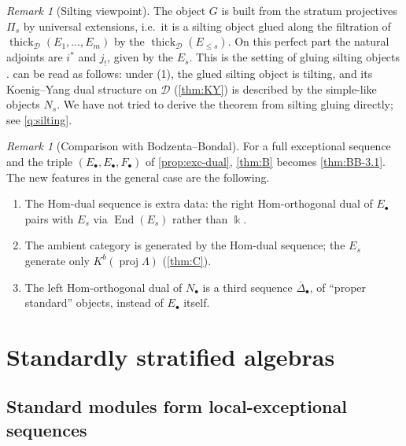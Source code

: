 \documentclass[11pt,reqno]{amsart}
\theoremstyle{plain}
\theoremstyle{definition}
\theoremstyle{remark}
\newtheorem{remark}[theorem]{Remark}
\newcommand{\kk}{\Bbbk}
\DeclareMathOperator{\End}{End}
\newcommand{\proj}{\operatorname{proj}}
\newcommand{\Kb}{K^b}
\newcommand{\thick}[2][\cD]{\operatorname{thick}_{#1}(#2)}
\newcommand{\Deltabar}{\overline{\Delta}}
\newcommand{\cD}{\mathcal{D}}
\begin{document}
\begin{remark}[Silting viewpoint]\label{rem:silting-view}
The object $G$ is built from the stratum projectives $\Pi_s$ by universal extensions, i.e.\ it is a silting object glued along the filtration of $\thick{E_1,\dots,E_m}$ by the $\thick{E_{\le s}}$. On this perfect part the natural adjoints are $i^*$ and $j_!$, given by the $E_s$. This is the setting of gluing silting objects \cite{LVY14}.  can be read as follows: under (1), the glued silting object is tilting, and its Koenig--Yang dual structure on $\cD$ (\cref{thm:KY}) is described by the simple-like objects $N_s$. We have not tried to derive the theorem from silting gluing directly; see \cref{q:silting}.
\end{remark}

\begin{remark}[Comparison with Bodzenta--Bondal]\label{rem:B-vs-BB}
For a full exceptional sequence and the triple $(E_\bullet,E_\bullet,F_\bullet)$ of \cref{prop:exc-dual}, \cref{thm:B} becomes \cref{thm:BB-3.1}. The new features in the general case are the following.
\begin{enumerate}
\item The Hom-dual sequence is extra data: the right Hom-orthogonal dual of $E_\bullet$ pairs with $E_s$ via $\End(E_s)$ rather than $\kk$.
\item The ambient category is generated by the Hom-dual sequence; the $E_s$ generate only $\Kb(\proj\Lambda)$ (\cref{thm:C}).
\item The left Hom-orthogonal dual of $N_\bullet$ is a third sequence $\Deltabar_\bullet$, of ``proper standard'' objects, instead of $E_\bullet$ itself.
\end{enumerate}
\end{remark}

\section{Standardly stratified algebras}\label{sec:stratified}

\subsection{Standard modules form local-exceptional sequences}
\end{document}

